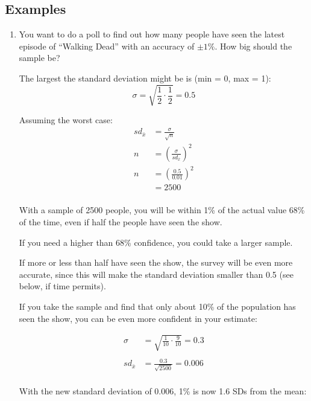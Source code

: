 \documentclass[portrait]{exam}
\begin{document}
  \subsection{Examples}
  \begin{enumerate}
    \item You want to do a poll to find out how many people have seen the latest
      episode of ``Walking Dead'' with an accuracy of $\pm 1\%$. How big should
      the sample be? 

      \begin{solution}
        The largest the standard deviation might be is (min = 0, max = 1):
        \[
          \sigma = \sqrt{\frac{1}{2} \cdot \frac{1}{2}} = 0.5
        \]

        Assuming the worst case:
        \begin{align*}
          sd_{\bar{x}} & = \frac{\sigma}{\sqrt{n}} \\
          n            & = \left( \frac{\sigma}{sd_{\bar{x}}} \right)^2 \\
          n            & = \left( \frac{0.5}{0.01} \right)^2 \\
                       & = 2500 \\
        \end{align*}

        With a sample of 2500 people, you will be within 1\% of the actual value
        68\% of the time, even if half the people have seen the show. 
        
        If you need a higher than 68\% confidence, you could take a larger
        sample.

        If more or less than half have seen the show, the survey will be even
        more accurate, since this will make the standard deviation smaller than
        0.5 (see below, if time permits).

        If you take the sample and find that only about 10\% of the population
        has seen the show, you can be even more confident in your estimate:

        \begin{align*}
          \sigma & = \sqrt{\frac{1}{10} \cdot \frac{9}{10}} = 0.3 \\
          \\
          sd_{\bar{x}} & = \frac{0.3}{\sqrt{2500}} = 0.006 \\
        \end{align*}

        With the new standard deviation of 0.006, 1\% is now 1.6 SDs from the
        mean: 
        

\end{solution}
\end{enumerate}
\end{document}
